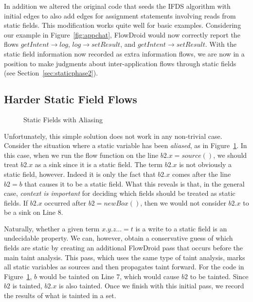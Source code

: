 In addition we altered the original code that seeds the IFDS algorithm with initial edges to also add edges for assignment statements involving reads from static fields. This modification works quite well for basic examples. Considering our example in Figure~\ref{fig:appchat}, FlowDroid would now correctly report the flows $getIntent\rightarrow log$, $log\rightarrow setResult$, and $getIntent\rightarrow setResult$. With the static field information now recorded as extra information flows, we are now in a position to make judgments about inter-application flows through static fields (see Section~\ref{sec:staticphase2}).

\subsection{Harder Static Field Flows}

\begin{figure}

\caption{Static Fields with Aliasing}
\label{fig:aliased}
\end{figure}

Unfortunately, this simple solution does not work in any non-trivial case. Consider the situation where a static variable has been \emph{aliased}, as in Figure~\ref{fig:aliased}. In this case, when we run the flow function on the line $b2.x = source()$, we should treat $b2.x$ as a sink since it is a static field. The term $b2.x$ is not obviously a static field, however. Indeed it is only the fact that $b2.x$ comes after the line $b2 = b$ that causes it to be a static field. What this reveals is that, in the general case, \emph{context is important} for deciding which fields should be treated as static fields. If $b2.x$ occurred after $b2 = new Box()$, then we would not consider $b2.x$ to be a sink on Line 8.

Naturally, whether a given term $x.y.z... = t$ is a write to a static field is an undecidable property. We can, however, obtain a conservative guess of which fields are static by creating an additional FlowDroid pass that occurs before the main taint analysis. This pass, which uses the same type of taint analysis, marks all static variables as sources and then propagates taint forward. For the code in Figure~\ref{fig:aliased}, $b$ would be tainted on Line 7, which would cause $b2$ to be tainted. Since $b2$ is tainted, $b2.x$ is also tainted. Once we finish with this initial pass, we record the results of what is tainted in a set.

